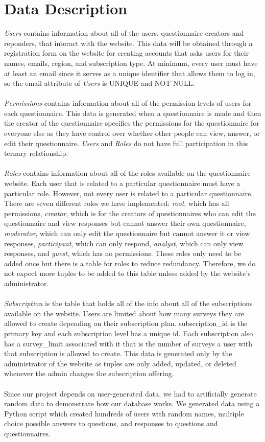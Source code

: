 \documentclass[12pt, oneside, a4paper]{article}
\begin{document}
    \section{Data Description}
    \emph{Users} contains information about all of the users, questionnaire creators and reponders, that interact with the website. This data will be obtained through a registration form on the website for creating accounts that asks users for their names, emails, region, and subscription type. At minimum, every user must have at least an email since it serves as a unique identifier that allows them to log in, so the email attribute of \emph{Users} is UNIQUE and NOT NULL.
    \\
    \\
    \emph{Permissions} contains information about all of the permission levels of users for each questionnaire. This data is generated when a questionnaire is made and then the creator of the questionnaire specifies the permissions for the questionnaire for everyone else as they have control over whether other people can view, answer, or edit their questionnaire. \emph{Users} and \emph{Roles} do not have full participation in this ternary relationship.
    \\
    \\
    \emph{Roles} contains information about all of the roles available on the questionnaire website. Each user that is related to a particular questionnaire must have a particular role. However, not every user is related to a particular questionnaire. There are seven different roles we have implemented: \emph{root}, which has all permissions, \emph{creator}, which is for the creators of questionnaires who can edit the questionnaire and view responses but cannot answer their own questionnaire, \emph{moderator}, which can only edit the questionnaire but cannot answer it or view responses, \emph{participant}, which can only respond, \emph{analyst}, which can only view responses, and \emph{guest}, which has no permissions. These roles only need to be added once but there is a table for roles to reduce redundancy. Therefore, we do not expect more tuples to be added to this table unless added by the website's administrator.
    \\
    \\
    \emph{Subscription} is the table that holds all of the info about all of the subscriptions available on the website. Users are limited about how many surveys they are allowed to create depending on their subscription plan. subscription\_id is the primary key and each subscription level has a unique id. Each subscription also has a survey\_limit associated with it that is the number of surveys a user with that subscription is allowed to create. This data is generated only by the administrator of the website as tuples are only added, updated, or deleted whenever the admin changes the subscription offering.
    \\
    \\
    Since our project depends on user-generated data, we had to artificially generate random data to demonstrate how our database works. We generated data using a Python script which created hundreds of users with random names, multiple choice possible answers to questions, and responses to questions and questionnaires.
\end{document}

